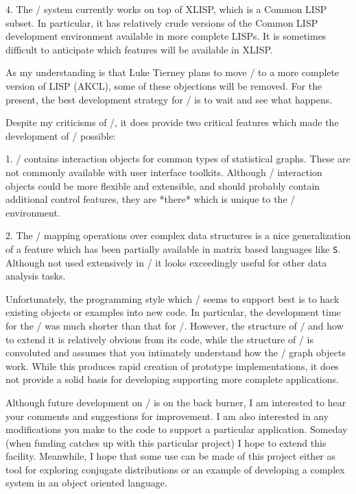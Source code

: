 \item{4.} The \lispstat/ system currently works on top of XLISP, which
is a Common LISP subset.  In particular, it has relatively crude
versions of the Common LISP development environment available in more
complete LISPs.  It is sometimes difficult to anticipate which
features will be available in XLISP.

As my understanding is that Luke Tierney plans to move \lispstat/ to a
more complete version of LISP (AKCL), some of these objections will be
removed.  For the present, the best development strategy for \eltoy/
is to wait and see what happens.

Despite my criticisms of \lispstat/, it does provide two critical
features which made the development of \eltoy/ possible:

\item{1.} \lispstat/ contains interaction objects for common types of
statistical graphs.  These are not commonly available with user
interface toolkits.  Although \lispstat/ interaction objects could be
more flexible and extensible, and should probably contain additional
control features, they are *there* which is unique to the \lispstat/
environment. 

\item{2.} The \lispstat/ mapping operations over complex data
structures is a nice generalization of a feature which has been
partially available in matrix based languages like {\tt S\/}.  Although
not used extensively in \eltoy/ it looks exceedingly useful for other
data analysis tasks.

Unfortunately, the programming style which \lispstat/ seems to support
best is to hack existing objects or examples into new code.  In
particular, the development time for the \clttoy/ was much shorter
than that for \disttoy/.   However, the structure of \disttoy/ and how
to extend it is relatively obvious from its code, while the structure
of \clttoy/ is convoluted and assumes that you intimately understand
how the  \lispstat/ graph objects work.  While this produces
rapid creation of prototype implementations, it does not provide a
solid basis for developing supporting more complete applications.


\medskip

Although future development on \eltoy/ is on the back burner, I am
interested to hear your comments and suggestions for improvement.  I
am also interested in any modifications you make to the code to
support a particular application.  Someday (when funding catches up
with this particular project) I hope to extend this facility.
Meanwhile, I hope that some use can be made of this project either as
tool for exploring conjugate distributions or an example of developing
a complex system in an object oriented language.

